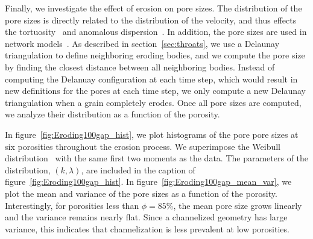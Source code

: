 \documentclass{jfm}
\begin{document}
Finally, we investigate the effect of erosion on pore sizes.  The
distribution of the pore sizes is directly related to the distribution
of the velocity, and thus effects the tortuosity~\citep{den-ica-hid2018}
and anomalous dispersion~\citep{dea-qua-bir-jua2018}. In addition, the
pore sizes are used in network models~\citep{bry-mel-cad1993,
bry-kin-mel1993}.  As described in section~\ref{sec:throats}, we use a
Delaunay triangulation to define neighboring eroding bodies, and we
compute the pore size by finding the closest distance between all
neighboring bodies.  Instead of computing the Delanuay configuration at
each time step, which would result in new definitions for the pores at
each time step, we only compute a new Delaunay triangulation when a
grain completely erodes.  Once all pore sizes are computed, we analyze
their distribution as a function of the porosity.  

In figure~\ref{fig:Eroding100gap_hist}, we plot histograms of the pore
pore sizes at six porosities throughout the erosion process. We
superimpose the Weibull distribution~\citep{ioa-cha1993} with the same
first two moments as the data.  The parameters of the distribution,
$(k,\lambda)$, are included in the caption of
figure~\ref{fig:Eroding100gap_hist}.  In
figure~\ref{fig:Eroding100gap_mean_var}, we plot the mean and variance
of the pore sizes as a function of the porosity.  Interestingly, for
porosities less than $\phi = 85\%$, the mean pore size grows linearly
and the variance remains nearly flat. Since a channelized geometry has
large variance, this indicates that channelization is less prevalent at
low porosities.
\end{document}
